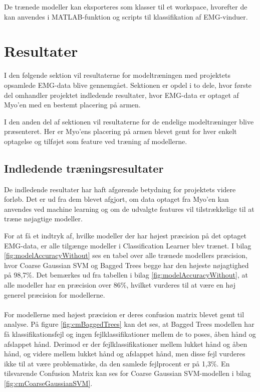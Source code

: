 De trænede modeller kan eksporteres som klasser til et workspace, hvorefter de kan anvendes i MATLAB-funktion og scripts til klassifikation af EMG-vinduer.

\section{Resultater}	
I den følgende sektion vil resultaterne for modeltræningen med projektets opsamlede EMG-data blive gennemgået. Sektionen er opdel i to dele, hvor første del omhandler projektet indledende resultater, hvor EMG-data er optaget af Myo'en med en bestemt placering på armen.

I den anden del af sektionen vil resultaterne for de endelige modeltræninger blive præsenteret. Her er Myo'ens placering på armen blevet gemt for hver enkelt optagelse og tilføjet som feature ved træning af modellerne.

 \subsection{Indledende træningsresultater}
 De indledende resultater har haft afgørende betydning for projektets videre forløb. Det er ud fra dem blevet afgjort, om data optaget fra Myo'en kan anvendes ved machine learning og om de udvalgte features vil tilstrækkelige til at træne nøjagtige modeller. 
 
For at få et indtryk af, hvilke modeller der har højest præcision på det optaget EMG-data, er alle tilgænge modeller i Classification Learner blev trænet. I bilag \ref{fig:modelAccuracyWithout} ses en tabel over alle trænede modellers præcision, hvor Coarse Gaussian SVM og Bagged Trees begge har den højeste nøjagtighed på 98,7\%.
Det bemærkes ud fra tabellen i bilag \ref{fig:modelAccuracyWithout}, at alle modeller har en præcision over 86\%, hvilket vurderes til at være en høj generel præcision for modellerne. 
\\\\
For modellerne med højest præcision er deres confusion matrix blevet gemt til analyse. På figure \ref{fig:cmBaggedTrees} kan det ses, at Bagged Trees modellen har få klassifikationsfejl og ingen fejlklassifikationer mellem de to poses, åben hånd og afslappet hånd. Derimod er der fejlklassifikationer mellem lukket hånd og åben hånd, og videre mellem lukket hånd og afslappet hånd, men disse fejl vurderes ikke til at være problematiske, da den samlede fejlprocent er på 1,3\%. En tilsvarende Confusion Matrix kan ses for Coarse Gaussian SVM-modellen i bilag \ref{fig:cmCoarseGaussianSVM}. 
 

